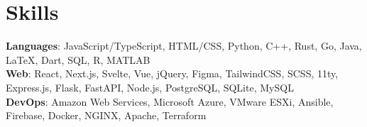 \documentclass{article}
\begin{document}
\section*{Skills}
\textbf{Languages}: JavaScript/TypeScript, HTML/CSS, Python, C++, Rust, Go, Java, {\selectfont\LaTeX}, Dart, SQL, R, MATLAB\\
\textbf{Web}: React, Next.js, Svelte, Vue, jQuery, Figma, TailwindCSS, SCSS, 11ty, Express.js, Flask, FastAPI, Node.js, PostgreSQL, SQLite, MySQL\\
\textbf{DevOps}: Amazon Web Services, Microsoft Azure, VMware ESXi, Ansible, Firebase, Docker, NGINX, Apache, Terraform\\
\end{document}
